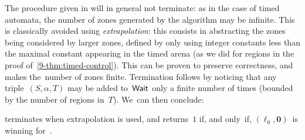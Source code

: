 
The procedure given in  will in general not
terminate: as in the case of timed automata, the number of zones
generated by the algorithm may be infinite. This is classically
avoided using \emph{extrapolation}: this consists in abstracting the
zones being considered by larger zones, defined by only using integer
constants less than the maximal constant appearing in the timed arena
(as we did for regions in the proof
of~\cref{9-thm:timed-control}). This can be proven to preserve
correctness, and makes the~number of zones finite. Termination follows
by noticing that any triple~$(S,\alpha,T)$ may be added to~$\textsf{Wait}$ only
a finite number of times (bounded by the number of regions
in~$T$). 
%
We~can then conclude:
\begin{theorem}
 terminates when extrapolation is used, and returns~$1$ if, and only~if,
$(\ell_0,\mathbf{0})$~is winning for~\Eve.
\end{theorem}
